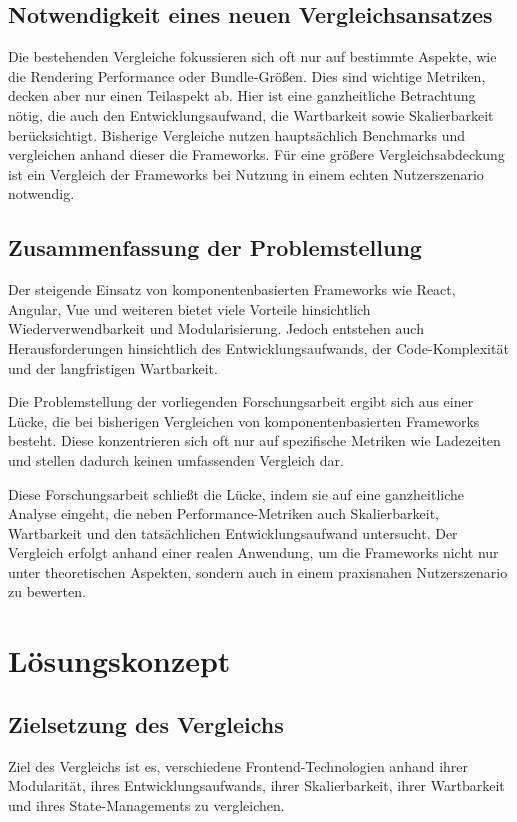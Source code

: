 \documentclass[oneside]{ausarbeitung}
\begin{document}
\section{Notwendigkeit eines neuen Vergleichsansatzes}

Die bestehenden Vergleiche fokussieren sich oft nur auf bestimmte Aspekte, wie die Rendering Performance oder Bundle-Größen. Dies sind wichtige Metriken, decken aber nur einen Teilaspekt ab. Hier ist eine ganzheitliche Betrachtung nötig, die auch den Entwicklungsaufwand, die Wartbarkeit sowie Skalierbarkeit berücksichtigt. Bisherige Vergleiche nutzen hauptsächlich Benchmarks und vergleichen anhand dieser die Frameworks. Für eine größere Vergleichsabdeckung ist ein Vergleich der Frameworks bei Nutzung in einem echten Nutzerszenario notwendig. 

\section{Zusammenfassung der Problemstellung}
Der steigende Einsatz von komponentenbasierten Frameworks wie React, Angular, Vue und weiteren bietet viele Vorteile hinsichtlich Wiederverwendbarkeit und Modularisierung. Jedoch entstehen auch Herausforderungen hinsichtlich des Entwicklungsaufwands, der Code-Komplexität und der langfristigen Wartbarkeit.

Die Problemstellung der vorliegenden Forschungsarbeit ergibt sich aus einer Lücke, die bei bisherigen Vergleichen von komponentenbasierten Frameworks besteht. Diese konzentrieren sich oft nur auf spezifische Metriken wie Ladezeiten und stellen dadurch keinen umfassenden Vergleich dar.

Diese Forschungsarbeit schließt die Lücke, indem sie auf eine ganzheitliche Analyse eingeht, die neben Performance-Metriken auch Skalierbarkeit, Wartbarkeit und den tatsächlichen Entwicklungsaufwand untersucht. Der Vergleich erfolgt anhand einer realen Anwendung, um die Frameworks nicht nur unter theoretischen Aspekten, sondern auch in einem praxisnahen Nutzerszenario zu bewerten.

\chapter{Lösungskonzept}
\label{cha:loesungskonzept}

\section{Zielsetzung des Vergleichs}
Ziel des Vergleichs ist es, verschiedene Frontend-Technologien anhand ihrer Modularität, ihres Entwicklungsaufwands, ihrer Skalierbarkeit, ihrer Wartbarkeit und ihres State-Managements zu vergleichen.
\end{document}
